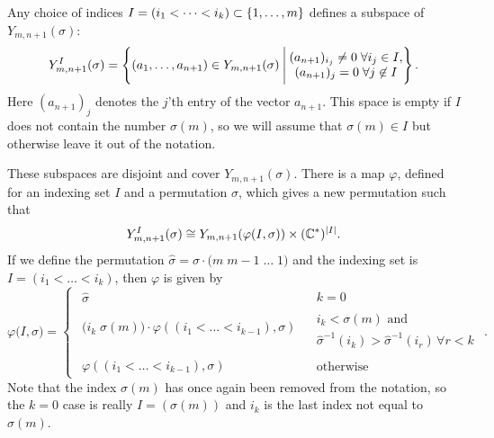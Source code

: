 \begin{lemma}
  \label{lem:permutation}
  Any choice of indices $I= (i_1<\dots<i_k) \subset \left\{ 1,\dots,m \right\}$
  defines a subspace of $Y_{m,n+1}(\sigma)$:
  \[ Y_{m,n+1}^I(\sigma) = \left\{ (a_1,\dots,a_{n+1}) \in
    Y_{m,n+1}(\sigma) \:\Bigg\vert\: 
    \begin{matrix} 
      (a_{n+1})_{i_j} \neq 0\; \forall i_j \in I, \\
      (a_{n+1})_j = 0 \;\forall j \not\in I
    \end{matrix}  \right\}. \]
  Here $(a_{n+1})_j$ denotes the $j$'th entry of the vector $a_{n+1}$.
  This space is empty if $I$ does not contain the number $\sigma(m)$,
  so we will assume that $\sigma(m) \in I$ but otherwise leave it out
  of the notation.
  
  These subspaces are disjoint and cover $Y_{m,n+1}(\sigma)$. There is
  a map $\varphi$,
  defined for an indexing set $I$ and a permutation $\sigma$, which
  gives a new permutation such that
  \[ Y_{m,n+1}^I(\sigma) \cong Y_{m,n+1}(\varphi(I,\sigma)) \times
  (\mathbb{C}^*)^{\left| I \right|}. \]
  If we define the permutation $\widehat \sigma = \sigma \cdot
  \big(m\; m-1\; \dots \; 1\big)$ and the indexing set is ${I = (i_1 <
    \dots < i_k)}$, then $\varphi$ is given by
  \[ \varphi\big(I,\sigma\big) = 
  \begin{cases}
    \begin{matrix} \widehat\sigma \end{matrix} & 
    \begin{array}{l} k = 0 \end{array} \\
    \begin{matrix}
      \big( i_k\; \sigma(m) \big) \cdot \varphi\left( (i_1 < \dots <
        i_{k-1}),\sigma\right) \\
    \end{matrix} &
    \begin{array}{l} i_k < \sigma(m) \text{ and } \\
      \widehat\sigma^{-1}(i_k) > \widehat\sigma^{-1}(i_r) \,
      \forall r < k\end{array}\\
    \begin{matrix}
      \varphi\left( (i_1 < \dots < i_{k-1}),\sigma\right)
    \end{matrix} &
    \begin{array}{l} \text{otherwise} \end{array}
  \end{cases}. \]
  Note that the index $\sigma(m)$ has once again been removed from the
  notation, 
  so the $k = 0$ case is really $I = (\sigma(m))$ and $i_k$
  is the last index not equal to $\sigma(m)$.
\end{lemma} 
